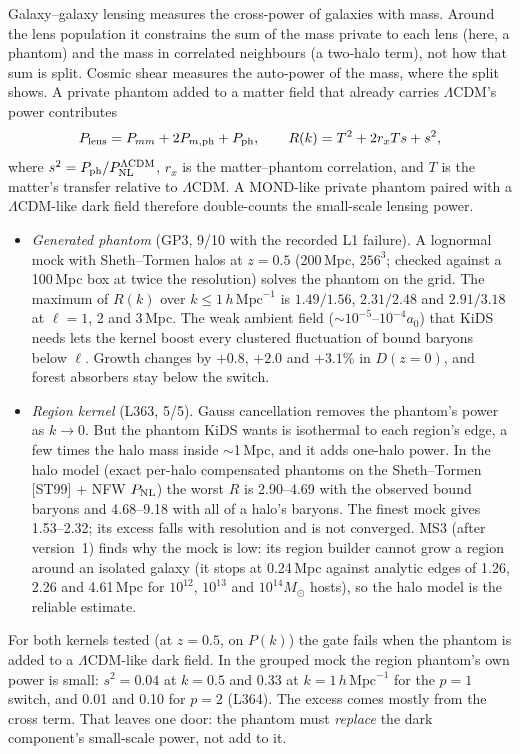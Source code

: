 \documentclass[10pt]{article}
\newcommand{\hMpc}{\,h\,\mathrm{Mpc}^{-1}}
\begin{document}
Galaxy--galaxy lensing measures the cross-power of galaxies with mass. Around the lens population it constrains the sum of the mass private to each lens (here, a phantom) and the mass in correlated neighbours (a two-halo term), not how that sum is split. Cosmic shear measures the auto-power of the mass, where the split shows. A private phantom added to a matter field that already carries $\Lambda$CDM's power contributes
\begin{equation}
P_{\rm lens}=P_{mm}+2P_{m,{\rm ph}}+P_{\rm ph},\qquad R(k)=T^2+2r_xTs+s^2,
\end{equation}
where $s^2=P_{\rm ph}/P^{\Lambda{\rm CDM}}_{\rm NL}$, $r_x$ is the matter--phantom correlation, and $T$ is the matter's transfer relative to $\Lambda$CDM. A MOND-like private phantom paired with a $\Lambda$CDM-like dark field therefore double-counts the small-scale lensing power.
\begin{itemize}
\item \emph{Generated phantom} (GP3, 9/10 with the recorded L1 failure). A lognormal mock with Sheth--Tormen halos at $z=0.5$ (200\,Mpc, $256^3$; checked against a 100\,Mpc box at twice the resolution) solves the phantom on the grid. The maximum of $R(k)$ over $k\leq1\hMpc$ is $1.49/1.56$, $2.31/2.48$ and $2.91/3.18$ at $\ell=1$, 2 and 3\,Mpc. The weak ambient field ($\sim10^{-5}$--$10^{-4}a_0$) that KiDS needs lets the kernel boost every clustered fluctuation of bound baryons below $\ell$. Growth changes by $+0.8$, $+2.0$ and $+3.1\%$ in $D(z=0)$, and forest absorbers stay below the switch.
\item \emph{Region kernel} (L363, 5/5). Gauss cancellation removes the phantom's power as $k\to0$. But the phantom KiDS wants is isothermal to each region's edge, a few times the halo mass inside $\sim$1\,Mpc, and it adds one-halo power. In the halo model (exact per-halo compensated phantoms on the Sheth--Tormen [ST99] + NFW $P_{\rm NL}$) the worst $R$ is 2.90--4.69 with the observed bound baryons and 4.68--9.18 with all of a halo's baryons. The finest mock gives 1.53--2.32; its excess falls with resolution and is not converged. MS3 (after version~1) finds why the mock is low: its region builder cannot grow a region around an isolated galaxy (it stops at 0.24\,Mpc against analytic edges of 1.26, 2.26 and 4.61\,Mpc for $10^{12}$, $10^{13}$ and $10^{14}M_\odot$ hosts), so the halo model is the reliable estimate.
\end{itemize}
For both kernels tested (at $z=0.5$, on $P(k)$) the gate fails when the phantom is added to a $\Lambda$CDM-like dark field. In the grouped mock the region phantom's own power is small: $s^2=0.04$ at $k=0.5$ and 0.33 at $k=1\hMpc$ for the $p=1$ switch, and 0.01 and 0.10 for $p=2$ (L364). The excess comes mostly from the cross term. That leaves one door: the phantom must \emph{replace} the dark component's small-scale power, not add to it.
\end{document}
